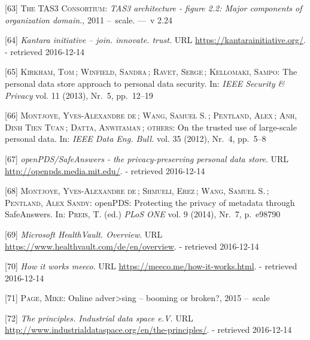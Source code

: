 \documentclass[12pt,english,a4paper,titlepage,cleardoublepage=empty,dottedtoc]{report}
\begin{document}
\hypertarget{ref-graphic_2011_architecture_components-of-organization-domain}{}
{[}63{]} \textsc{The TAS3 Consortium}: \emph{TAS3 architecture - figure
2.2: Major components of organization domain.}, 2011 --~scale. ---~v
2.24

\hypertarget{ref-web_kantara-initiative}{}
{[}64{]} \emph{Kantara initiative -- join. innovate. trust.} URL
\url{https://kantarainitiative.org/}. - retrieved 2016-12-14

\hypertarget{ref-paper_2014_personal-data-store-approach}{}
{[}65{]} \textsc{Kirkham, Tom}\,; \textsc{Winfield, Sandra}\,;
\textsc{Ravet, Serge}\,; \textsc{Kellomaki, Sampo}: The personal data
store approach to personal data security. In: \emph{IEEE Security \&
Privacy} vol. 11 (2013), Nr.~5, pp.~12--19

\hypertarget{ref-paper_2012_openpds_on-trusted-use-of-large-scale-personal-data}{}
{[}66{]} \textsc{Montjoye, Yves-Alexandre de}\,; \textsc{Wang, Samuel
S.}\,; \textsc{Pentland, Alex}\,; \textsc{Anh, Dinh Tien Tuan}\,;
\textsc{Datta, Anwitaman}\,; \textsc{others}: On the trusted use of
large-scale personal data. In: \emph{IEEE Data Eng. Bull.} vol. 35
(2012), Nr.~4, pp.~5--8

\hypertarget{ref-web_mit_openpds-safeanswers-project-page}{}
{[}67{]} \emph{openPDS/SafeAnswers - the privacy-preserving personal
data store}. URL \url{http://openpds.media.mit.edu/}. - retrieved
2016-12-14

\hypertarget{ref-paper_2014_openpds_protecting-privacy-of-meta-data-through-safeanswers}{}
{[}68{]} \textsc{Montjoye, Yves-Alexandre de}\,; \textsc{Shmueli,
Erez}\,; \textsc{Wang, Samuel S.}\,; \textsc{Pentland, Alex Sandy}:
openPDS: Protecting the privacy of metadata through SafeAnswers. In:
\textsc{Preis, T.} (ed.) \emph{PLoS ONE} vol. 9 (2014), Nr.~7, p.~e98790

\hypertarget{ref-web_microsoft_healthvault}{}
{[}69{]} \emph{Microsoft HealthVault. Overview}. URL
\url{https://www.healthvault.com/de/en/overview}. - retrieved 2016-12-14

\hypertarget{ref-web_meeco_how-it-works}{}
{[}70{]} \emph{How it works meeco}. URL
\url{https://meeco.me/how-it-works.html}. - retrieved 2016-12-14

\hypertarget{ref-slides_2015_meeco-case-study}{}
{[}71{]} \textsc{Page, Mike}: Online adver\textgreater{}sing -- booming
or broken?, 2015 --~scale

\hypertarget{ref-web_industrial-data-space}{}
{[}72{]} \emph{The principles. Industrial data space e.V.} URL
\url{http://www.industrialdataspace.org/en/the-principles/}. - retrieved
2016-12-14
\end{document}
